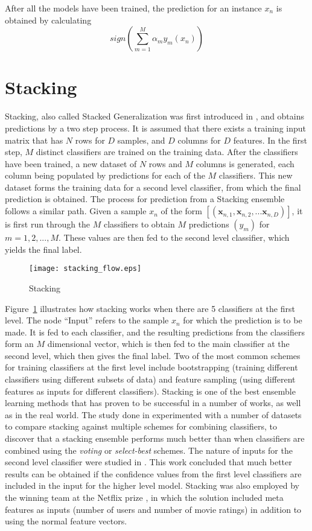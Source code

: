 After all the models have been trained, the prediction for an instance $x_n$ is obtained by calculating $$sign(\displaystyle \sum_{m = 1}^{M} \alpha_m y_m(x_n))$$

\section{Stacking}
Stacking, also called Stacked Generalization was first introduced in \cite{wolpert1992stacked}, and obtains predictions by a two step process. It is assumed that there exists a training input matrix that has $N$ rows for $D$ samples, and $D$ columns for $D$ features. In the first step, $M$ distinct classifiers are trained on the training data. After the classifiers have been trained, a new dataset of $N$ rows and $M$ columns is generated, each column being populated by predictions for each of the $M$ classifiers. This new dataset forms the training data for a second level classifier, from which the final prediction is obtained. The process for prediction from a Stacking ensemble follows a similar path. Given a sample $x_n$ of the form $[(\mathbf{x}_{n, 1}, \mathbf{x}_{n, 2}, ... \mathbf{x}_{n, D})]$, it is first run through the $M$ classifiers to obtain $M$ predictions $(y_m)$ for $m = 1, 2, ..., M$. These values are then fed to the second level classifier, which yields the final label.\\

\begin{figure}
    \centering
    \texttt{[image: stacking\_flow.eps]}
    \caption{Stacking}
    \label{fig:stacking_flow}
\end{figure}

Figure~\ref{fig:stacking_flow} illustrates how stacking works when there are 5 classifiers at the first level. The node ``Input'' refers to the sample $x_n$ for which the prediction is to be made. It is fed to each classifier, and the resulting predictions from the classifiers form an $M$ dimensional vector, which is then fed to the main classifier at the second level, which then gives the final label. Two of the most common schemes for training classifiers at the first level include bootstrapping (training different classifiers using different subsets of data) and feature sampling (using different features as inputs for different classifiers). Stacking is one of the best ensemble learning methods that has proven to be successful in a number of works, as well as in the real world. The study done in \cite{dvzeroski2004combining} experimented with a number of datasets to compare stacking against multiple schemes for combining classifiers, to discover that a stacking ensemble performs much better than when classifiers are combined using the \emph{voting} or \emph{select-best} schemes. The nature of inputs for the second level classifier were studied in \cite{ting2011issues}. This work concluded that much better results can be obtained if the confidence values from the first level classifiers are included in the input for the higher level model. Stacking was also employed by the winning team at the Netflix prize \cite{koren2009bellkor}, in which the solution included meta features as inputs (number of users and number of movie ratings) in addition to using the normal feature vectors.
